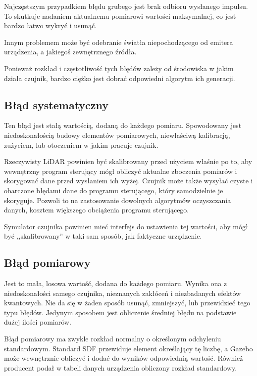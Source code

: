 		Najczęstszym przypadkiem błędu grubego jest brak odbioru wysłanego impulsu. 
		To skutkuje nadaniem aktualnemu pomiarowi wartości maksymalnej, co jest bardzo łatwo wykryć i usunąć.

		Innym problemem może być odebranie światła niepochodzącego od emitera urządzenia, a jakiegoś zewnętrznego źródła.

		Ponieważ rozkład i częstotliwość tych błędów zależy od środowiska w jakim działa czujnik, bardzo ciężko jest dobrać odpowiedni algorytm ich generacji.

	\subsection{Błąd systematyczny}
		Ten błąd jest stałą wartością, dodaną do każdego pomiaru.
		Spowodowany jest niedoskonałością budowy elementów pomiarowych, niewłaściwą kalibracją, zużyciem, lub otoczeniem w jakim pracuje czujnik.

		Rzeczywisty LiDAR powinien być skalibrowany przed użyciem właśnie po to, aby wewnętrzny program sterujący mógł obliczyć aktualne zboczenia pomiarów
		i skorygować dane przed wysłaniem ich wyżej.
		Czujnik może także wysyłać czyste i obarczone błędami dane do programu sterującego, który samodzielnie je skoryguje.
		Pozwoli to na zastosowanie dowolnych algorytmów oczyszczania danych, kosztem większego obciążenia programu sterującego.

		Symulator czujnika powinien mieć interfejs do ustawienia tej wartości, aby mógł być ,,skalibrowany'' w taki sam sposób, jak faktyczne urządzenie.

	\subsection{Błąd pomiarowy}
		Jest to mała, losowa wartość, dodana do każdego pomiaru.
		Wynika ona z niedoskonałości samego czujnika, nieznanych zakłóceń i niezbadanych efektów kwantowych.
		Nie da się w żaden sposób usunąć, zmniejszyć, lub przewidzieć tego typu błędów.
		Jedynym sposobem jest obliczenie średniej błędu na podstawie dużej ilości pomiarów.

		Błąd pomiarowy ma zwykle rozkład normalny o określonym odchyleniu standardowym.
		Standard SDF przewiduje element określający tę liczbę, a Gazebo może wewnętrznie obliczyć i dodać do wyników odpowiednią wartość.
		Również producent podał w tabeli danych urządzenia obliczony rozkład standardowy.

